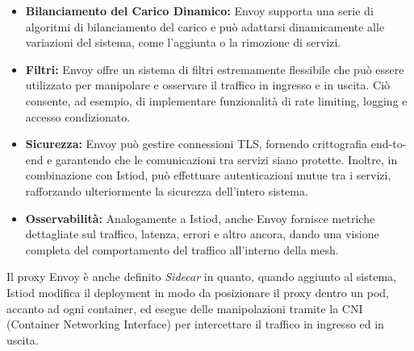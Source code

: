 \begin{itemize}
    \item \textbf{Bilanciamento del Carico Dinamico:} Envoy supporta una serie di algoritmi di bilanciamento del carico e può adattarsi dinamicamente alle variazioni del sistema, come l'aggiunta o la rimozione di servizi.
    
    \item \textbf{Filtri:} Envoy offre un sistema di filtri estremamente flessibile che può essere utilizzato per manipolare e osservare il traffico in ingresso e in uscita. Ciò consente, ad esempio, di implementare funzionalità di rate limiting, logging e accesso condizionato.
    
    \item \textbf{Sicurezza:} Envoy può gestire connessioni TLS, fornendo crittografia end-to-end e garantendo che le comunicazioni tra servizi siano protette. Inoltre, in combinazione con Istiod, può effettuare autenticazioni mutue tra i servizi, rafforzando ulteriormente la sicurezza dell'intero sistema.
    
    \item \textbf{Osservabilità:} Analogamente a Istiod, anche Envoy fornisce metriche dettagliate sul traffico, latenza, errori e altro ancora, dando una visione completa del comportamento del traffico all'interno della mesh.
\end{itemize}


Il proxy Envoy è anche definito \textit{Sidecar} in quanto, quando aggiunto al sistema, Istiod modifica il deployment in modo da posizionare il proxy dentro un pod, accanto ad ogni container, ed esegue delle manipolazioni tramite la CNI (Container Networking Interface) per intercettare il traffico in ingresso ed in uscita.
